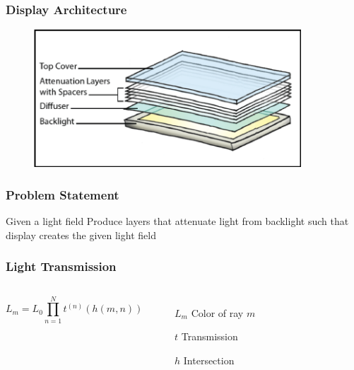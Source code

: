 \documentclass[12pt, compress]{beamer}
\begin{document}
\begin{frame}[fragile]
	\frametitle{Display Architecture}
	
	\begin{figure}
		\includegraphics[width=10cm]{images/display_architecture.png}
		\caption*{\cite{WetzsteinTomo}}	
	\end{figure}
\end{frame}

\begin{frame}[fragile]
	\frametitle{Problem Statement}
	{\large
	\begin{block}{Given a light field}
		Produce layers that attenuate light from backlight such that display creates the given light field
	\end{block}
	}
\end{frame}

\begin{frame}[fragile]
	\frametitle{Light Transmission}
	\vspace{1cm}
	\begin{columns}[onlytextwidth]
			
			\begin{equation*}
				L_m = L_0 \prod_{n=1}^{N} t^{(n)} (h(m, n)) 
			\end{equation*}
			\begin{itemize}[<alert@+>]
			    \item[$L_m$] Color of ray $m$
			    \item[$t$] Transmission
			    \item[$h$] Intersection 
			\end{itemize}
	\end{columns}
	\vspace{1cm}
	\begin{center}
	\end{center}
\end{frame}
\end{document}
